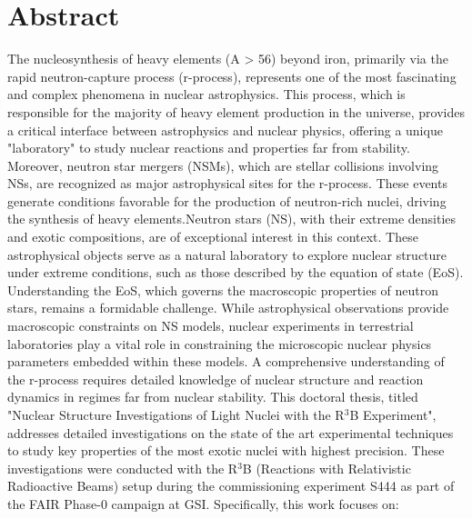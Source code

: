 \thispagestyle{empty}
\section*{Abstract}
The nucleosynthesis of heavy elements (A > 56) beyond iron, primarily via the rapid neutron-capture process (r-process), represents one of the most fascinating and complex phenomena in nuclear astrophysics. This process, which is responsible for the majority of heavy element production in the universe, provides a critical interface between astrophysics and nuclear physics, offering a unique "laboratory" to study nuclear reactions and properties far from stability. Moreover, neutron star mergers (NSMs), which are stellar collisions involving NSs, are recognized as major astrophysical sites for the r-process. These events generate conditions favorable for the production of neutron-rich nuclei, driving the synthesis of heavy elements.Neutron stars (NS), with their extreme densities and exotic compositions, are of exceptional interest in this context. These astrophysical objects serve as a natural laboratory to explore nuclear structure under extreme conditions, such as those described by the equation of state (EoS). Understanding the EoS, which governs the macroscopic properties of neutron stars, remains a formidable challenge. While astrophysical observations provide macroscopic constraints on NS models, nuclear experiments in terrestrial laboratories play a vital role in constraining the microscopic nuclear physics parameters embedded within these models. A comprehensive understanding of the r-process requires detailed knowledge of nuclear structure and reaction dynamics in regimes far from nuclear stability.\newline
This doctoral thesis, titled "Nuclear Structure Investigations of Light Nuclei with the R$^3$B Experiment", addresses detailed investigations on the state of the art experimental techniques to study key properties of the most exotic nuclei with highest precision. These investigations were conducted with the R$^3$B (Reactions with Relativistic Radioactive Beams) setup during the commissioning experiment S444 as part of the FAIR Phase-0 campaign at GSI. Specifically, this work focuses on:

